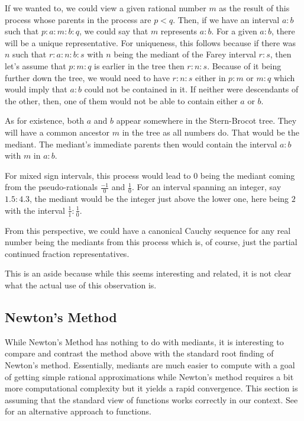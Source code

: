 \documentclass[12pt]{article}
\begin{document}
If we wanted to, we could view a given rational number $m$ as the result of this process whose parents in the process are $p < q$. Then, if we have an interval $a:b$ such that $p : a : m : b : q$, we could say that $m$ represents $a:b$. For a given $a:b$, there will be a unique representative. For uniqueness, this follows because if there was $n$ such that $r : a: n: b : s$ with $n$ being the mediant of the Farey interval $r:s$, then let's assume that $p:m:q$ is earlier in the tree then $r:n:s$. Because of it being further down the tree, we would need to have $r:n:s$ either in $p:m$ or $m:q$ which would imply that $a:b$ could not be contained in it. If neither were descendants of the other, then, one of them would not be able to contain either $a$ or $b$. 

As for existence, both $a$ and $b$ appear somewhere in the Stern-Brocot tree. They will have a common ancestor $m$ in the tree as all numbers do. That would be the mediant. The mediant's immediate parents then would contain the interval $a:b$ with $m$ in $a:b$.

For mixed sign intervals, this process would lead to $0$ being the mediant coming from the pseudo-rationals $\frac{-1}{0}$ and $\frac{1}{0}$. For an interval spanning an integer, say $1.5:4.3$, the mediant would be the integer just above the lower one,  here being $2$ with the interval $\frac{1}{1}: \frac{1}{0}$.

From this perspective, we could have a canonical Cauchy sequence for any real number being the mediants from this process which is, of course, just the partial continued fraction representatives. 

This is an aside because while this seems interesting and related, it is not clear what the actual use of this observation is. 

\subsection{Newton's Method}

While Newton's Method has nothing to do with mediants, it is interesting to compare and contrast the method above with the standard root finding of Newton's method. Essentially, mediants are much easier to compute with a goal of getting simple rational approximations while Newton's method requires a bit more computational complexity but it yields a rapid convergence. This section is assuming that the standard view of functions works correctly in our context. See \cite{taylor23funora} for an alternative approach to functions.
\end{document}
